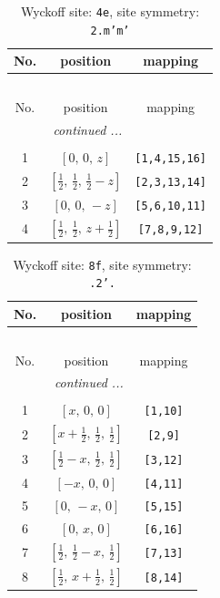 \documentclass[fleqn,8pt]{jsarticle}
\begin{document}
\renewcommand{\arraystretch}{1.2}
\begin{longtable}{ccc}
\caption{Wyckoff site: {\tt 4e}, site symmetry: {\tt 2.m'm'}}
 \\
 \hline \hline
No. & position & mapping \\ \hline \endfirsthead

\multicolumn{2}{l}{\tablename\ \thetable{}} \\
 \hline \hline
No. & position & mapping \\ \hline \endhead

 \hline \hline
\multicolumn{2}{r}{\footnotesize\it continued ...} \\ \endfoot

 \hline \hline
\multicolumn{2}{r}{} \\ \endlastfoot

1 & $\left[ 0,\, 0,\, z \right]$ & {\tt [1,4,15,16]} \\ \hline
2 & $\left[ \frac{1}{2},\, \frac{1}{2},\, \frac{1}{2} - z \right]$ & {\tt [2,3,13,14]} \\ \hline
3 & $\left[ 0,\, 0,\, - z \right]$ & {\tt [5,6,10,11]} \\ \hline
4 & $\left[ \frac{1}{2},\, \frac{1}{2},\, z + \frac{1}{2} \right]$ & {\tt [7,8,9,12]} \\
\end{longtable}
\renewcommand{\arraystretch}{1.2}
\begin{longtable}{ccc}
\caption{Wyckoff site: {\tt 8f}, site symmetry: {\tt .2'.}}
 \\
 \hline \hline
No. & position & mapping \\ \hline \endfirsthead

\multicolumn{2}{l}{\tablename\ \thetable{}} \\
 \hline \hline
No. & position & mapping \\ \hline \endhead

 \hline \hline
\multicolumn{2}{r}{\footnotesize\it continued ...} \\ \endfoot

 \hline \hline
\multicolumn{2}{r}{} \\ \endlastfoot

1 & $\left[ x,\, 0,\, 0 \right]$ & {\tt [1,10]} \\ \hline
2 & $\left[ x + \frac{1}{2},\, \frac{1}{2},\, \frac{1}{2} \right]$ & {\tt [2,9]} \\ \hline
3 & $\left[ \frac{1}{2} - x,\, \frac{1}{2},\, \frac{1}{2} \right]$ & {\tt [3,12]} \\ \hline
4 & $\left[ - x,\, 0,\, 0 \right]$ & {\tt [4,11]} \\ \hline
5 & $\left[ 0,\, - x,\, 0 \right]$ & {\tt [5,15]} \\ \hline
6 & $\left[ 0,\, x,\, 0 \right]$ & {\tt [6,16]} \\ \hline
7 & $\left[ \frac{1}{2},\, \frac{1}{2} - x,\, \frac{1}{2} \right]$ & {\tt [7,13]} \\ \hline
8 & $\left[ \frac{1}{2},\, x + \frac{1}{2},\, \frac{1}{2} \right]$ & {\tt [8,14]} \\
\end{longtable}
\end{document}
